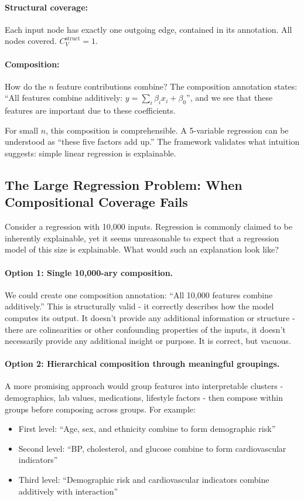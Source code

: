 \documentclass{article}
\begin{document}
\paragraph{Structural coverage:} Each input node has exactly one outgoing edge, contained in its annotation. All nodes covered. $C_V^{\text{struct}} = 1$.

\paragraph{Composition:} How do the $n$ feature contributions combine? The composition annotation states: ``All features combine additively: $y = \sum_i \beta_i x_i + \beta_0$'', and we see that these features are important due to these coefficients.

For small $n$, this composition is comprehensible. A 5-variable regression can be understood as ``these five factors add up.'' The framework validates what intuition suggests: simple linear regression is explainable.

\subsection{The Large Regression Problem: When Compositional Coverage Fails}

Consider a regression with 10,000 inputs. Regression is commonly claimed to be inherently explainable, yet it seems unreasonable to expect that a regression model of this size is explainable. What would such an explanation look like?

\paragraph{Option 1: Single 10,000-ary composition.} We could create one composition annotation: ``All 10,000 features combine additively.'' This is structurally valid - it correctly describes how the model computes its output. It doesn't provide any additional information or structure - there are colinearities or other confounding properties of the inputs, it doesn't necessarily provide any additional insight or purpose. It is correct, but vacuous.

\paragraph{Option 2: Hierarchical composition through meaningful groupings.} A more promising approach would group features into interpretable clusters - demographics, lab values, medications, lifestyle factors - then compose within groups before composing across groups. For example:
\begin{itemize}
    \item First level: ``Age, sex, and ethnicity combine to form demographic risk''
    \item Second level: ``BP, cholesterol, and glucose combine to form cardiovascular indicators''
    \item Third level: ``Demographic risk and cardiovascular indicators combine additively with interaction''
\end{itemize}
\end{document}
